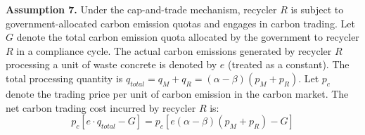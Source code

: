 \documentclass[authoryear,preprint,review,times,10pt]{elsarticle}
\begin{document}
\textbf{Assumption 7.} Under the cap-and-trade mechanism, recycler $R$ is subject to government-allocated carbon emission quotas and engages in carbon trading. Let $G$ denote the total carbon emission quota allocated by the government to recycler $R$ in a compliance cycle. The actual carbon emissions generated by recycler $R$ processing a unit of waste concrete is denoted by $e$ (treated as a constant). The total processing quantity is $q_{total} = q_M + q_R = (\alpha - \beta)(p_M + p_R)$. Let $p_c$ denote the trading price per unit of carbon emission in the carbon market. The net carbon trading cost incurred by recycler $R$ is:
\begin{equation}
p_c \left[ e \cdot q_{total} - G \right] = p_c \left[ e(\alpha - \beta)(p_M + p_R) - G \right]
\end{equation}
\end{document}
